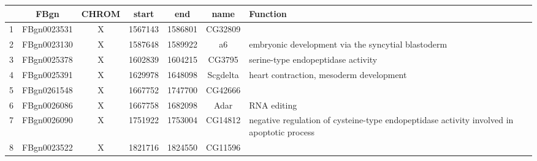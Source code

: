 \centering \begin{tabular}{c|c|c|c|c|c | p{2in}}
&FBgn	&CHROM	&start	&end	&name & Function\\\hline
1&FBgn0023531	&X	&1567143	&1586801	&CG32809 & \\
2	&FBgn0023130	&X	&1587648	&1589922	&a6 & embryonic development via 
the syncytial blastoderm\\
3	&FBgn0025378	&X	&1602839	&1604215	&CG3795 & serine-type 
endopeptidase activity\\
4	&FBgn0025391	&X	&1629978	&1648098	&Scgdelta & heart contraction, 
mesoderm development\\
5	&FBgn0261548	&X	&1667752	&1747700	&CG42666\\
6	&FBgn0026086	&X	&1667758	&1682098	&Adar & RNA editing\\
7	&FBgn0026090	&X	&1751922	&1753004	&CG14812 & negative regulation 
of cysteine-type endopeptidase activity involved in apoptotic process\\
8	&FBgn0023522	&X	&1821716	&1824550	&CG11596&
\end{tabular}
